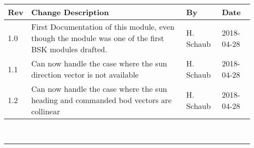 \documentclass[]{BasiliskReportMemo}
\begin{document}
\makeCover

%
%
\newpage
\pagestyle{empty}
{\renewcommand{\arraystretch}{2}
\noindent
\begin{longtable}{|p{0.5in}|p{3.5in}|p{1.07in}|p{0.9in}|}
\hline
{\bfseries Rev} & {\bfseries Change Description} & {\bfseries By}& {\bfseries Date} \\
\hline
1.0 & First Documentation of this module, even though the module was one of the first BSK modules drafted. & H. Schaub & 2018-04-28\\
1.1 & Can now handle the case where the sun direction vector is not available & H. Schaub & 2018-04-28 \\
1.2 & Can now handle the case where the sun heading and commanded bod vectors are collinear & H. Schaub & 2018-04-28 \\
\hline

\end{longtable}
}



\newpage
\setcounter{page}{1}
\pagestyle{fancy}

\tableofcontents %
~\\ \hrule ~\\ %










	









\end{document}
